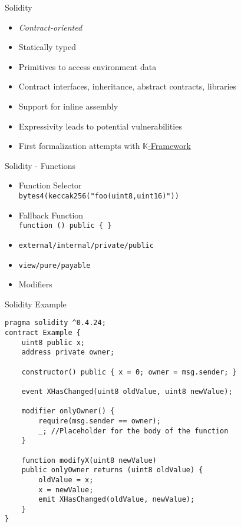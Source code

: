 \begin{frame}[fragile]{Solidity}
    \begin{itemize}
        \item \emph{Contract-oriented}
        \item Statically typed
        \item Primitives to access environment data %
        \item Contract interfaces, inheritance, abstract contracts, libraries
        \item Support for inline assembly
        \item Expressivity leads to potential vulnerabilities
        \item First formalization attempts with \href{https://github.com/kframework/solidity-semantics}{$\mathbb{K}$-Framework}
    \end{itemize}
\end{frame}

\begin{frame}[fragile]{Solidity - Functions}
        \begin{itemize}
        \item Function Selector \\
        \lstinline!bytes4(keccak256("foo(uint8,uint16)"))!
        \item Fallback Function \\
        \lstinline!function () public { }!
        \item \texttt{external/internal/private/public}
        \item \texttt{view/pure/payable}
        \item Modifiers
        \end{itemize}
\end{frame}


\begin{frame}[fragile]{Solidity Example}
\begin{lstlisting}[frame=single, language=Solidity]
pragma solidity ^0.4.24;
contract Example {
    uint8 public x; 
    address private owner;
    
    constructor() public { x = 0; owner = msg.sender; }
    
    event XHasChanged(uint8 oldValue, uint8 newValue);
    
    modifier onlyOwner() {
        require(msg.sender == owner);
        _; //Placeholder for the body of the function
    }
    
    function modifyX(uint8 newValue) 
    public onlyOwner returns (uint8 oldValue) {
        oldValue = x;
        x = newValue;
        emit XHasChanged(oldValue, newValue);
    }
}

\end{lstlisting}

\end{frame}


